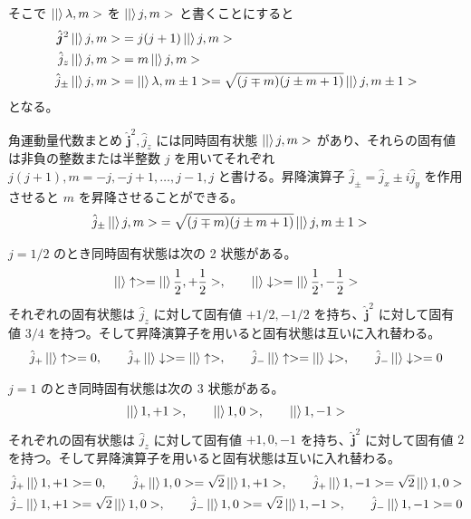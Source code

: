 \documentclass[uplatex,dvipdfmx,a4paper,11pt]{jlreq}
\numberwithin{equation}{section}
\theoremstyle{definition}
\begin{document}
そこで $\ket|\lambda, m>$ を $\ket|j, m>$ と書くことにすると
\begin{align}
  \hat{\bm{j}}^2\ket|j, m> & = j(j + 1)\ket|j, m>                                                  \\
  \hat{j}_z\ket|j, m>      & = m\ket|j, m>                                                         \\
  \hat{j}_\pm\ket|j, m>    & = \ket|\lambda, m\pm 1> = \sqrt{(j \mp m)(j \pm m + 1)}\ket|j, m\pm1>
\end{align}
となる。

\begin{itembox}[l]{角運動量代数まとめ}
  $\hat{\bm{j}}^2, \hat{j}_z$ には同時固有状態 $\ket|j, m>$ があり、それらの固有値は非負の整数または半整数 $j$ を用いてそれぞれ $j(j+1), m = -j,-j+1,\ldots,j-1,j$ と書ける。昇降演算子 $\hat{j}_\pm = \hat{j}_x \pm i\hat{j}_y$ を作用させると $m$ を昇降させることができる。
  \begin{align}
    \hat{j}_\pm\ket|j, m> & = \sqrt{(j \mp m)(j \pm m + 1)}\ket|j, m\pm1>
  \end{align}
\end{itembox}

\begin{proposition}
  $j = 1/2$ のとき同時固有状態は次の 2 状態がある。
  \begin{align}
    \ket|\uparrow> = \ket|\frac{1}{2}, +\frac{1}{2}>, \qquad \ket|\downarrow> = \ket|\frac{1}{2}, -\frac{1}{2}>
  \end{align}
  それぞれの固有状態は $\hat{j}_z$ に対して固有値 $+1/2, -1/2$ を持ち、$\hat{\bm{j}}^2$ に対して固有値 $3/4$ を持つ。そして昇降演算子を用いると固有状態は互いに入れ替わる。
  \begin{align}
    \hat{j}_+\ket|\uparrow> = 0, \qquad \hat{j}_+\ket|\downarrow> = \ket|\uparrow>, \qquad \hat{j}_-\ket|\uparrow> = \ket|\downarrow>, \qquad \hat{j}_-\ket|\downarrow> = 0
  \end{align}
\end{proposition}
\begin{proposition}
  $j = 1$ のとき同時固有状態は次の 3 状態がある。
  \begin{align}
    \ket|1, +1>, \qquad \ket|1, 0>, \qquad \ket|1, -1>
  \end{align}
  それぞれの固有状態は $\hat{j}_z$ に対して固有値 $+1, 0, -1$ を持ち、$\hat{\bm{j}}^2$ に対して固有値 $2$ を持つ。そして昇降演算子を用いると固有状態は互いに入れ替わる。
  \begin{align}
    \hat{j}_+\ket|1, +1> = 0, \qquad \hat{j}_+\ket|1, 0> = \sqrt{2}\ket|1, +1>, \qquad \hat{j}_+\ket|1, -1> = \sqrt{2}\ket|1, 0> \\
    \hat{j}_-\ket|1, +1> = \sqrt{2}\ket|1, 0>, \qquad \hat{j}_-\ket|1, 0> = \sqrt{2}\ket|1, -1>, \qquad \hat{j}_-\ket|1, -1> = 0
  \end{align}
\end{proposition}
\end{document}
